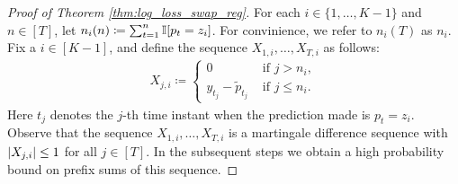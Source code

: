 \begin{proof}[Proof of Theorem \ref{thm:log_loss_swap_reg}]
    For each $i \in \{1, \dots, K - 1\}$ and $n \in [T]$, let $n_{i}(n) \coloneqq \sum_{t = 1} ^ {n} \mathbb{I}{\left[p_{t} = z_{i}\right]}$. For convinience, we refer to $n_{i}(T)$ as $n_{i}$. Fix a $i \in [K - 1]$, and define the sequence $X_{1, i}, \dots, X_{T, i}$ as follows: \begin{align*}
        X_{j, i} \coloneqq \begin{cases}
            0 & \text{ if } j > n_{i}, \\
            y_{t_{j}} - \tilde{p}_{t_{j}} & \text{ if } j \le n_{i}.
        \end{cases}
    \end{align*}
    Here $t_{j}$ denotes the $j$-th time instant when the prediction made is $p_{t} = z_{i}$. Observe that the sequence $X_{1, i}, \dots, X_{T, i}$ is a martingale difference sequence with $\left\lvert X_{j, i}\right\rvert \le 1$ for all $j \in [T]$. In the subsequent steps we obtain a high probability bound on prefix sums of this sequence. 
    

\end{proof}
